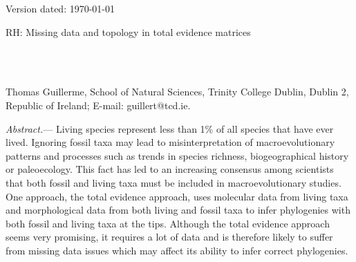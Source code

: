 \documentclass[12pt,letterpaper]{article}
\renewcommand{\subsubsection}[1]{%
\vspace{2ex}
\noindent
\textit{#1.}---}
\begin{document}


\begin{flushright}
Version dated: \today
\end{flushright}
\bigskip
\noindent RH: Missing data and topology in total evidence matrices %

\bigskip
\medskip
\begin{center}

\bigskip

\\
\\
\end{center}
\medskip
{} Thomas Guillerme, School of Natural Sciences, Trinity College Dublin, Dublin 2, Republic of Ireland; E-mail: guillert@tcd.ie.\\
\vspace{1in}


%
%


\subsubsection{Abstract}
Living species represent less than 1\% of all species that have ever lived. Ignoring fossil taxa may lead to misinterpretation of macroevolutionary patterns and processes such as trends in species richness, biogeographical history or paleoecology.
This fact has led to an increasing consensus among scientists that both fossil and living taxa must be included in macroevolutionary studies.
One approach, the total evidence approach, uses molecular data from living taxa and morphological data from both living and fossil taxa to infer phylogenies with both fossil and living taxa at the tips.
Although the total evidence approach seems very promising, it requires a lot of data and is therefore likely to suffer from missing data issues which may affect its ability to infer correct phylogenies.
\end{document}
